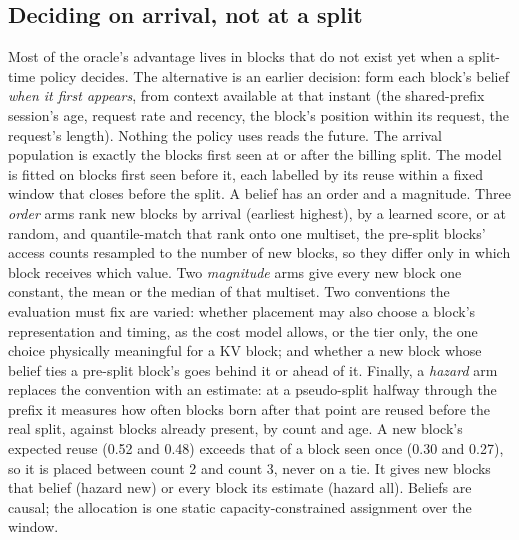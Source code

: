 \subsection{Deciding on arrival, not at a split}
\label{sec:arrival}
Most of the oracle's advantage lives in blocks that do not exist yet when a split-time policy
decides. The alternative is an earlier decision: form each block's belief \emph{when it first appears},
from context available at that instant (the shared-prefix session's age, request rate and recency, the block's
position within its request, the request's length). Nothing the policy uses reads the future. The arrival
population is exactly the blocks first seen at or after the billing split. The model is fitted on blocks
first seen before it, each labelled by its reuse within a fixed window that closes before the split.
A belief has an order and a magnitude. Three \emph{order} arms rank new blocks by arrival (earliest
highest), by a learned score, or at random, and quantile-match that rank onto one multiset, the pre-split
blocks' access counts resampled to the number of new blocks, so they differ only in which block receives
which value. Two \emph{magnitude} arms give every new block one constant, the mean or the median of that
multiset. Two conventions the evaluation must fix are varied: whether placement may also choose a
block's representation and timing, as the cost model allows, or the tier only, the one choice physically
meaningful for a KV block; and whether a new block whose belief ties a pre-split block's goes behind it
or ahead of it. Finally, a \emph{hazard} arm replaces the convention with an estimate: at a pseudo-split
halfway through the prefix it measures how often blocks born after that point are reused before the real
split, against blocks already present, by count and age. A new block's expected reuse (0.52 and 0.48)
exceeds that of a block seen once (0.30 and 0.27), so it is placed between count 2 and count 3, never on
a tie. It gives new blocks that belief (hazard new) or every block its estimate (hazard all). Beliefs
are causal; the allocation is one static capacity-constrained assignment over the window.

